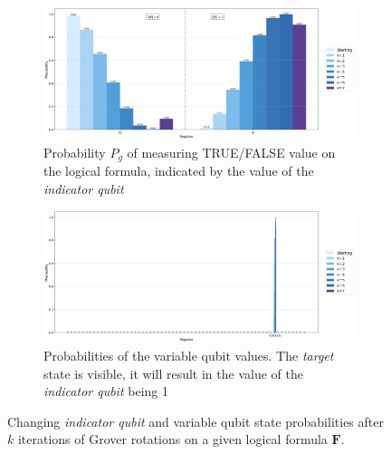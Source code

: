 \documentclass[encoding=utf8,british]{tumphthesis}
\begin{document}
            \begin{figure}[H]
            \centering

            \begin{subfigure}{\textwidth}
            \includegraphics[width=\linewidth]{pics/overrotation_final6.png}
            \caption{Probability $P_{g}$ of measuring TRUE/FALSE value on the logical formula, indicated by the value of the \textit{indicator qubit} }
            \label{subfig:AA_final}
            \end{subfigure}

            \medskip %
            \begin{subfigure}{\textwidth}
            \includegraphics[width=\linewidth]{pics/overrotation_variable6.png}
            \caption{Probabilities of the variable qubit values. The \textit{target} state is visible, it will result in the value of the \textit{indicator qubit} being 1}
            \label{subfig:AA_variable}
            \end{subfigure}

            \caption{Changing \textit{indicator qubit} and variable qubit state probabilities after $k$ iterations of Grover rotations on a given logical formula $\textbf{F}$.}
            \label{fig:AA_log_formula}

            \end{figure}
\end{document}
